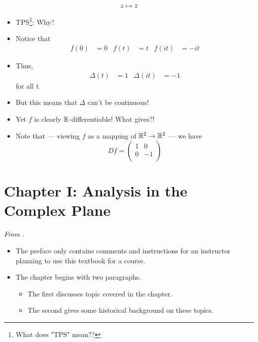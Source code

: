\documentclass[../notes.tex]{subfiles}
\begin{document}
\begin{itemize}
\begin{equation*}
        z \mapsto \bar{z}
    \end{equation*}
    \begin{itemize}
        \item TPS\footnote{What does "TPS" mean??}: Why?
        \item Notice that
        \begin{align*}
            f(0) &= 0&
            f(t) &= t&
            f(it) &= -it
        \end{align*}
        \item Thus,
        \begin{align*}
            \Delta(t) &= 1&
            \Delta(it) &= -1
        \end{align*}
        for all $t$.
        \item But this means that $\Delta$ can't be continuous!
        \item Yet $f$ is clearly $\mathbb{R}$-differentiable! What gives?!
        \item Note that --- viewing $f$ as a mapping of $\mathbb{R}^2\to\mathbb{R}^2$ --- we have
        \begin{equation*}
            Df =
            \begin{pmatrix}
                1 & 0\\
                0 & -1\\
            \end{pmatrix}
        \end{equation*}
    \end{itemize}
\end{itemize}



\section{Chapter I: Analysis in the Complex Plane}
\emph{From \textcite{bib:FischerLieb}.}
\begin{itemize}
    \item The preface only contains comments and instructions for an instructor planning to use this textbook for a course.
    \item The chapter begins with two paragraphs.
    \begin{itemize}
        \item The first discusses topic covered in the chapter.
        \item The second gives some historical background on these topics.
    \end{itemize}
\end{itemize}
\end{document}
